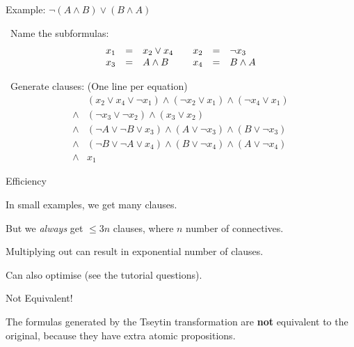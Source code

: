 \documentclass[xetex,aspectratio=169,14pt,hyperref={pdfpagelabels=true,pdflang={en-GB}}]{beamer}
\begin{document}
\begin{frame}
  {Example: $\lnot (A \land B) \lor (B \land A)$}

  ~Name the subformulas:
  \begin{displaymath}
    \begin{array}{lcl@{\hspace{2em}}lcl}
      x_1&=&x_2 \lor x_4 &
      x_2&=&\lnot x_3 \\
      x_3&=&A \land B &
      x_4&=&B \land A
    \end{array}
  \end{displaymath}

  \pause

  ~Generate clauses: \textcolor{black!60}{(One line per equation)}
  \begin{displaymath}
    \begin{array}{cl}
      &(x_2 \lor x_4 \lor \lnot x_1) \land (\lnot x_2 \lor x_1) \land (\lnot x_4 \lor x_1) \\
      \land&(\lnot x_3 \lor \lnot x_2) \land (x_3 \lor x_2) \\
      \land&(\lnot A \lor \lnot B \lor x_3) \land (A \lor \lnot x_3) \land (B \lor \lnot x_3) \\
      \land&(\lnot B \lor \lnot A \lor x_4) \land (B \lor \lnot x_4) \land (A \lor \lnot x_4) \\
      \land&x_1
    \end{array}
  \end{displaymath}
\end{frame}

\begin{frame}
  {Efficiency}

  In small examples, we get many clauses.

  \bigskip

  But we \emph{always} get $\leq 3n$ clauses, where $n$ number of
  connectives.

  \bigskip

  Multiplying out can result in exponential number of clauses.

  \bigskip

  Can also optimise (see the tutorial questions).

\end{frame}


\begin{frame}
  {Not Equivalent!}

  The formulas generated by the Tseytin transformation are
  \textbf{not} equivalent to the original, because they have extra
  atomic propositions.
\end{frame}
\end{document}
